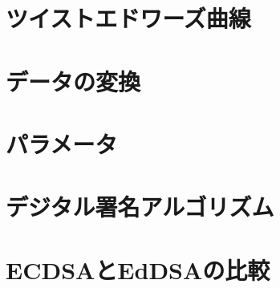 \section{ツイストエドワーズ曲線}

\section{データの変換}

\newpage
\section{パラメータ}

\section{デジタル署名アルゴリズム}

\section{ECDSAとEdDSAの比較}
